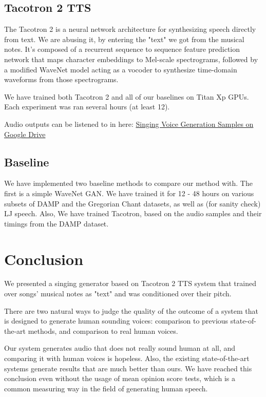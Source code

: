 \documentclass{article}
\begin{document}
\subsection*{Tacotron 2 TTS}

The Tacotron 2 \cite{shen2017natural} is 
a neural network architecture for synthesizing speech directly from text.
We are abusing it, by entering the "text" we got from the musical notes.
It's composed of a recurrent sequence to sequence feature prediction network that maps character embeddings to Mel-scale spectrograms, followed by a modified WaveNet model acting as a vocoder to synthesize time-domain waveforms from those spectrograms.

We have trained both Tacotron 2 and all of our baselines on Titan Xp GPUs.
Each experiment was ran several hours (at least 12).

Audio outputs can be listened to in here: \href{http://bit.ly/tau_ml_svg}{Singing Voice Generation Samples on Google Drive}


\subsection*{Baseline}
We have implemented two baseline methods to compare our method with.
The first is a simple WaveNet GAN.
We have trained it for 12 - 48 hours on various subsets of DAMP and the Gregorian Chant datasets, as well as (for sanity check) LJ speech.
Also, We have trained Tacotron, based on the audio samples and their timings from the DAMP dataset.

\section*{Conclusion}
We presented a singing generator based on Tacotron 2 TTS system that trained over songs' musical notes as "text" and was conditioned over their pitch.

There are two natural ways to judge the quality of the outcome of a system that is designed to generate human sounding voices: comparison to previous state-of-the-art methods, and comparison to real human voices.

Our system generates audio that does not really sound human at all, and comparing it with human voices is hopeless.
Also, the existing state-of-the-art systems generate results that are much better than ours.
We have reached this conclusion even without the usage of mean opinion score tests, which is a common measuring way in the field of generating human speech.
\end{document}
